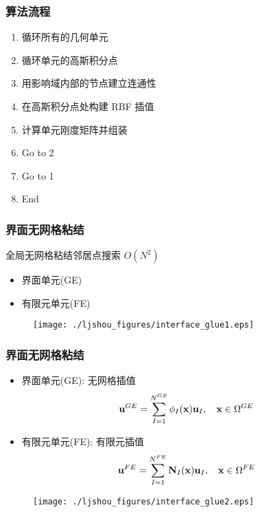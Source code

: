 \documentclass[mathserif]{beamer}
\begin{document}
\begin{CJK}{UTF8}{gkai}
\begin{frame}
	\frametitle{算法流程}
	\begin{enumerate}
		\item 循环所有的几何单元  
		\item 循环单元的高斯积分点
		\item 用影响域内部的节点建立连通性
		\item 在高斯积分点处构建 RBF 插值
		\item 计算单元刚度矩阵并组装
		\item Go to 2
		\item Go to 1
		\item End
	\end{enumerate}
\end{frame}

\begin{frame}
	\frametitle{界面无网格粘结}	
	\small 全局无网格粘结邻居点搜索 $O(N^2)$
	\begin{itemize}
		\item 界面单元(GE)
		\item 有限元单元(FE)
	\end{itemize}
	\begin{figure}
		\centering
		\texttt{[image: ./ljshou\_figures/interface\_glue1.eps]}
	\end{figure}
\end{frame}

\begin{frame}
	\frametitle{界面无网格粘结}	
	\begin{itemize}
		\small
		\item 界面单元(GE): 无网格插值
		\begin{equation}
			\small
			{\bf u}^{GE} = \sum_{I=1}^{N^{GE}}{\bf \phi}_I({\bf x}){\bf u}_I, \quad {\bf x} \in \Omega^{GE}
		\end{equation}
		\item 有限元单元(FE): 有限元插值
		\begin{equation}
			\small
			{\bf u}^{FE} = \sum_{I=1}^{N^{FE}}{\bf N}_I({\bf x}){\bf u}_I, \quad {\bf x} \in \Omega^{FE}
		\end{equation}
	\end{itemize}
			\begin{figure}
					\centering
					\texttt{[image: ./ljshou\_figures/interface\_glue2.eps]}
			\end{figure}
\end{frame}


\end{CJK}
\end{document}
